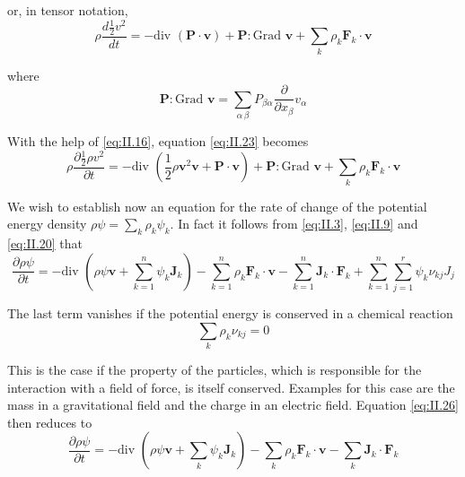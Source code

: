 or, in tensor notation,
\begin{equation}
\rho \frac{d \frac{1}{2} v^2}{d t} = - \textrm{div } \left(\bm{P}\cdot \bm{v}\right)
+
\bm{P} : \textrm{Grad } \bm{v} + \sum_k \rho_k \bm{F}_k \cdot \bm{v}
    \label{eq:II.23}
\end{equation}

where
\begin{equation}
\bm{P} : \textrm{Grad } \bm{v} = \sum_{\alpha\,\beta} P_{\beta \alpha} \frac{\partial}{\partial x_{\beta}} v_{\alpha}
    \label{eq:II.24}
\end{equation}

With the help of \eqref{eq:II.16}, equation \eqref{eq:II.23} becomes
\begin{equation}
\rho \frac{\partial \frac{1}{2} \rho v^2}{\partial t} = 
- \textrm{div } \left(\frac{1}{2} \rho \bm{v}^2 \bm{v} + \bm{P}\cdot \bm{v}\right)
+
\bm{P} : \textrm{Grad } \bm{v} + \sum_k \rho_k \bm{F}_k \cdot \bm{v}
    \label{eq:II.25}
\end{equation}

We wish to establish now an equation for the rate of change of the
potential energy density $\rho \psi = \sum_k \rho_k \psi_k$. In fact it follows from \eqref{eq:II.3}, \eqref{eq:II.9} and \eqref{eq:II.20} that
\begin{equation}
\frac{\partial \rho \psi}{\partial t} = - \textrm{div } \left( \rho \psi \bm{v}  + \sum_{k=1}^n \psi_k \bm{J}_k \right) - \sum_{k=1}^n \rho_k \bm{F}_k \cdot \bm{v} - \sum_{k=1}^n \bm{J}_k \cdot \bm{F}_k + \sum_{k=1}^n\sum_{j=1}^r \psi_k \nu_{kj} J_j
    \label{eq:II.26}
\end{equation}

The last term vanishes if the potential energy is conserved in a
chemical reaction
\begin{equation}
\sum_{k} \rho_k \nu_{kj} = 0
    \label{eq:II.27}
\end{equation}

This is the case if the property of the particles, which is responsible
for the interaction with a field of force, is itself conserved. Examples
for this case are the mass in a gravitational field and the charge in an
electric field. Equation \eqref{eq:II.26} then reduces to
\begin{equation}
\frac{\partial \rho \psi}{\partial t} = - \textrm{div } \left( \rho \psi \bm{v}  + \sum_{k} \psi_k \bm{J}_k \right) - \sum_{k} \rho_k \bm{F}_k \cdot \bm{v} - \sum_{k} \bm{J}_k \cdot \bm{F}_k
    \label{eq:II.28}
\end{equation}

